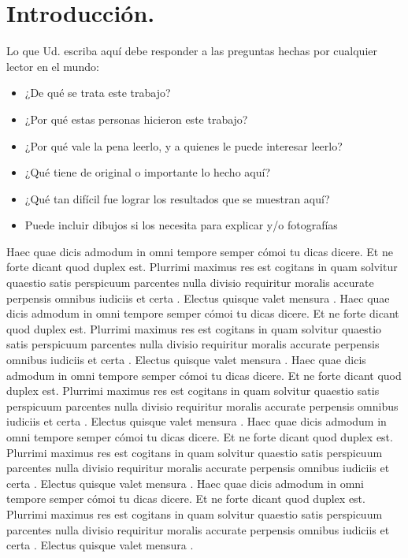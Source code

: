 \documentclass[10pt]{article}
\begin{document}
\section{Introducción.} 

 Lo que Ud. escriba aquí debe responder a las preguntas hechas por cualquier lector en el mundo: 
 
\begin{itemize}
\item ¿De qué se trata este trabajo?
\item ¿Por qué estas personas hicieron este trabajo?
\item ¿Por qué vale la pena leerlo, y a quienes le puede interesar leerlo?
\item ¿Qué tiene de original o importante lo hecho aquí?
\item ¿Qué tan difícil fue lograr los resultados que se muestran aquí?
\item Puede incluir dibujos si los necesita para explicar y/o fotografías

\end{itemize}
Haec quae dicis admodum in omni tempore semper cómoi tu dicas dicere. Et ne forte dicant quod duplex est. Plurrimi maximus res est cogitans in quam solvitur quaestio satis perspicuum parcentes nulla divisio requiritur moralis accurate perpensis omnibus iudiciis et certa . Electus quisque valet mensura .
Haec quae dicis admodum in omni tempore semper cómoi tu dicas dicere. Et ne forte dicant quod duplex est. Plurrimi maximus res est cogitans in quam solvitur quaestio satis perspicuum parcentes nulla divisio requiritur moralis accurate perpensis omnibus iudiciis et certa . Electus quisque valet mensura .
Haec quae dicis admodum in omni tempore semper cómoi tu dicas dicere. Et ne forte dicant quod duplex est. Plurrimi maximus res est cogitans in quam solvitur quaestio satis perspicuum parcentes nulla divisio requiritur moralis accurate perpensis omnibus iudiciis et certa . Electus quisque valet mensura .
Haec quae dicis admodum in omni tempore semper cómoi tu dicas dicere. Et ne forte dicant quod duplex est. Plurrimi maximus res est cogitans in quam solvitur quaestio satis perspicuum parcentes nulla divisio requiritur moralis accurate perpensis omnibus iudiciis et certa . Electus quisque valet mensura .
Haec quae dicis admodum in omni tempore semper cómoi tu dicas dicere. Et ne forte dicant quod duplex est. Plurrimi maximus res est cogitans in quam solvitur quaestio satis perspicuum parcentes nulla divisio requiritur moralis accurate perpensis omnibus iudiciis et certa . Electus quisque valet mensura .
\end{document}
